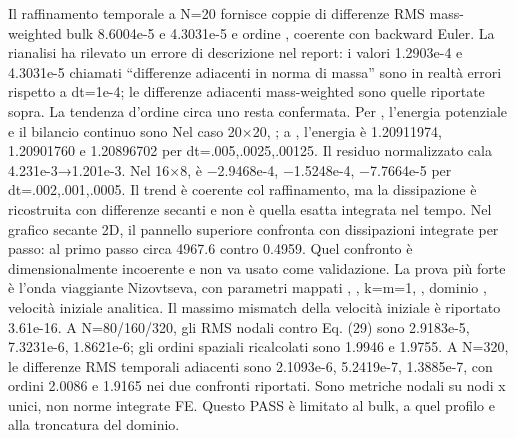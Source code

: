 {}Il raffinamento temporale a N=20 fornisce coppie di differenze RMS mass-weighted bulk 8.6004e-5 e 4.3031e-5 e ordine , coerente con backward Euler. La rianalisi ha rilevato un errore di descrizione nel report: i valori 1.2903e-4 e 4.3031e-5 chiamati “differenze adiacenti in norma di massa” sono in realtà errori rispetto a dt=1e-4; le differenze adiacenti mass-weighted sono quelle riportate sopra. La tendenza d’ordine circa uno resta confermata.\markdownRendererInterblockSeparator
{} Per , l’energia potenziale e il bilancio continuo sono\markdownRendererInterblockSeparator
{}\markdownRendererInterblockSeparator
{}Nel caso 20×20, ; a , l’energia è 1.20911974, 1.20901760 e 1.20896702 per dt=.005,.0025,.00125. Il residuo normalizzato cala 4.231e-3→1.201e-3. Nel 16×8,  è −2.9468e-4, −1.5248e-4, −7.7664e-5 per dt=.002,.001,.0005. Il trend è coerente col raffinamento, ma la dissipazione è ricostruita con differenze secanti e non è quella esatta integrata nel tempo. Nel grafico secante 2D, il pannello superiore confronta  con dissipazioni integrate per passo: al primo passo circa 4967.6 contro 0.4959. Quel confronto è dimensionalmente incoerente e non va usato come validazione.\markdownRendererInterblockSeparator
{}
\markdownRendererSectionEnd \markdownRendererSectionBegin
{}\markdownRendererInterblockSeparator
{} La prova più forte è l’onda viaggiante Nizovtseva, con parametri mappati , , k=m=1, , dominio \markdownRendererInlineMath{[-12,12]\times[0,1]}, velocità iniziale analitica. Il massimo mismatch della velocità iniziale è riportato 3.61e-16. A N=80/160/320, gli RMS nodali contro Eq. (29) sono 2.9183e-5, 7.3231e-6, 1.8621e-6; gli ordini spaziali ricalcolati sono 1.9946 e 1.9755. A N=320, le differenze RMS temporali adiacenti sono 2.1093e-6, 5.2419e-7, 1.3885e-7, con ordini 2.0086 e 1.9165 nei due confronti riportati. Sono metriche nodali su nodi x unici, non norme integrate FE. Questo PASS è limitato al bulk, a quel profilo e alla troncatura del dominio.\markdownRendererInterblockSeparator
